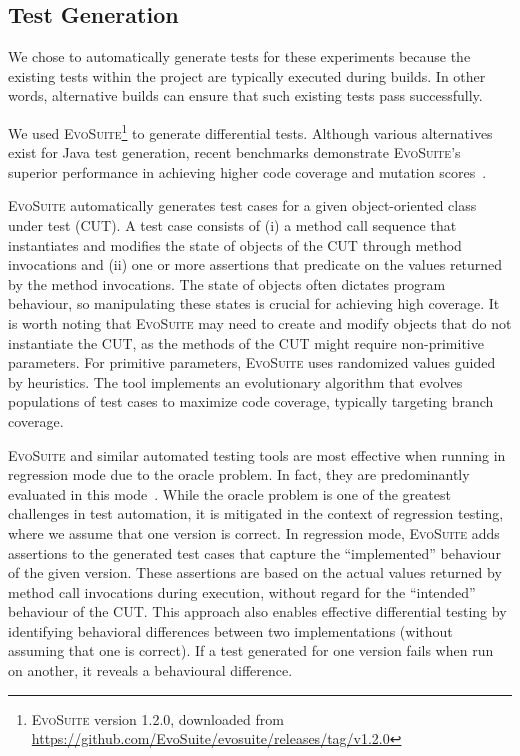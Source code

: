 \documentclass[conference]{IEEEtran}
\makeatletter
\newcommand{\evosuite}{\textsc{EvoSuite}\@\xspace}
\newcommand{\valerio}[1]{\textbf{\textcolor{blue}{[ \ding{46}Valerio: #1]}}}
\makeatother
\begin{document}
\subsection{Test Generation}

We chose to automatically generate tests for these experiments because the existing tests within the project are typically executed during builds. In other words, alternative builds can ensure that such existing tests pass successfully.

We used \evosuite\footnote{\evosuite version 1.2.0, downloaded from \url{https://github.com/EvoSuite/evosuite/releases/tag/v1.2.0}}
to generate differential tests. Although various alternatives exist for Java test generation, recent benchmarks demonstrate \evosuite's superior performance in achieving higher code coverage and mutation scores~\cite{jahangirova2023sbft}.

\evosuite automatically generates test cases for a given object-oriented class under test (CUT). A test case consists of (i) a method call sequence that instantiates and modifies the state of objects of the CUT through method invocations and (ii) one or more assertions that predicate on the values returned by the method invocations. The state of objects often dictates program behaviour, so manipulating these states is crucial for achieving high coverage. It is worth noting that \evosuite may need to create and modify objects that do not instantiate the CUT, as the methods of the CUT might require non-primitive parameters. For primitive parameters, \evosuite uses randomized values guided by heuristics. The tool implements an evolutionary algorithm that evolves populations of test cases to maximize code coverage, typically targeting branch coverage.

\evosuite and similar automated testing tools are most effective when running in regression mode due to the oracle problem. In fact, they are predominantly evaluated in this mode~\cite{jahangirova2023sbft,shamshiri2015automatically}. While the oracle problem is one of the greatest challenges in test automation, it is mitigated in the context of regression testing, where we assume that one version is correct. In regression mode, \evosuite adds assertions to the generated test cases that capture the ``implemented'' behaviour of the given version. These assertions are based on the actual values returned by method call invocations during execution, without regard for the ``intended'' behaviour of the CUT. This approach also enables effective differential testing by identifying behavioral differences between two implementations (without assuming that one is correct). If a test generated for one version fails when run on another, it reveals a behavioural difference. %
\end{document}

